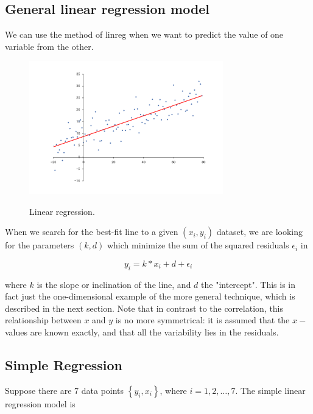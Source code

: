 \subsection{General linear regression model}

We can use the method of \gls{linreg} when we want to predict the value of one variable from the other.

\begin{figure}
  \centering
  \includegraphics[width=0.75\textwidth]{../Images/Linear_regression.png}\\
  \caption{Linear regression.}\label{fig:regression}
\end{figure}

When we search for the best-fit line to a given $(x_i,y_i)$ dataset, we are looking for the parameters $(k,d)$ which minimize the sum of the squared residuals $\epsilon_i$ in

\begin{equation}\label{eq:simpleRegression}
  y_i = k * x_i + d + \epsilon_i
\end{equation}

where $k$ is the slope or inclination of the line, and $d$ the "intercept". This is in fact just the one-dimensional example of the more general technique, which is described in the next section.
Note that in contrast to the correlation, this relationship between $x$ and $y$ is no more symmetrical: it is assumed that the $x-$values are known exactly, and that all the variability lies in the residuals.

\subsection{Simple Regression}

Suppose there are 7 data points $\left\{ {{y_i},{x_i}} \right\}$, where $i=1,2,…,7$. The simple linear regression model is

